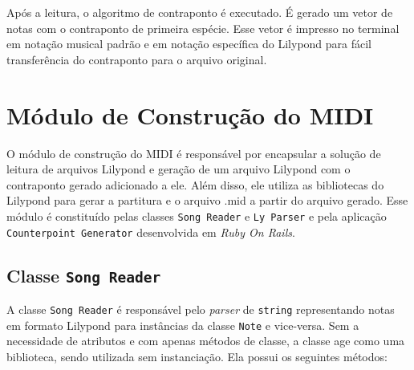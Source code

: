     Após a leitura, o algoritmo de contraponto é executado. É gerado um vetor de notas com o contraponto de primeira espécie. Esse vetor é impresso no terminal em notação musical padrão e em notação específica do Lilypond para fácil transferência do contraponto para o arquivo original.

  \section[Módulo de Construção do MIDI]{Módulo de Construção do MIDI}

    O módulo de construção do MIDI é responsável por encapsular a solução de leitura de arquivos Lilypond e geração de um arquivo Lilypond com o contraponto gerado adicionado a ele. Além disso, ele utiliza as bibliotecas do Lilypond para gerar a partitura e o arquivo .mid a partir do arquivo gerado. Esse módulo é constituído pelas classes \texttt{Song Reader} e \texttt{Ly Parser} e pela aplicação \texttt{Counterpoint Generator} desenvolvida em \textit{Ruby On Rails}.

    \subsection[Classe \texttt{Song Reader}]{Classe \texttt{Song Reader}}

      A classe \texttt{Song Reader} é responsável pelo \textit{parser} de \texttt{string} representando notas em formato Lilypond para instâncias da classe \texttt{Note} e vice-versa. Sem a necessidade de atributos e com apenas métodos de classe, a classe age como uma biblioteca, sendo utilizada sem instanciação. Ela possui os seguintes métodos:


